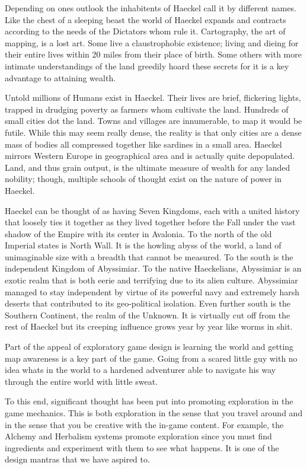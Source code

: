 \begin{multicols}{2}
Depending on ones outlook the inhabitents of Haeckel call it by different names. Like the chest of a sleeping beast the world of Haeckel expands and contracts according to the needs of the Dictators whom rule it. Cartography, the art of mapping, is a lost art. Some live a claustrophobic existence; living and dieing for their entire lives within 20 miles from their place of birth. Some others with more intimate understandings of the land greedily hoard these secrets for it is a key advantage to attaining wealth. 

Untold millions of Humans exist in Haeckel. Their lives are brief, flickering lights, trapped in drudging poverty as farmers whom cultivate the land. Hundreds of small cities dot the land. Towns and villages are innumerable, to map it would be futile. While this may seem really dense, the reality is that only cities are a dense mass of bodies all compressed together like sardines in a small area. Haeckel mirrors Western Europe in geographical area and is actually quite depopulated. Land, and thus grain output, is the ultimate measure of wealth for any landed nobility; though, multiple schools of thought exist on the nature of power in Haeckel.

Haeckel can be thought of as having Seven Kingdoms, each with a united history that loosely ties it together as they lived together before the Fall under the vast shadow of the Empire with its center in Avalonia. To the north of the old Imperial states is North Wall. It is the howling abyss of the world, a land of unimaginable size with a breadth that cannot be measured. To the south is the independent Kingdom of Abyssimiar. To the native Haeckelians, Abyssimiar is an exotic realm that is both eerie and terrifying due to its alien culture. Abyssimiar managed to stay independent by virtue of its powerful navy and extremely harsh deserts that contributed to its geo-political isolation. Even further south is the Southern Continent, the realm of the Unknown. It is virtually cut off from the rest of Haeckel but its creeping influence grows year by year like worms in shit.

\begin{framed}\centering
Part of the appeal of exploratory game design is learning the world and getting map awareness is a key part of the game. Going from a scared little guy with no idea whats in the world to a hardened adventurer able to navigate his way through the entire world with little sweat. 

To this end, significant thought has been put into promoting exploration in the game mechanics. This is both exploration in the sense that you travel around and in the sense that you be creative with the in-game content. For example, the Alchemy and Herbalism systems promote exploration since you must find ingredients and experiment with them to see what happens. It is one of the design mantras that we have aspired to.
\end{framed}


\end{multicols}
